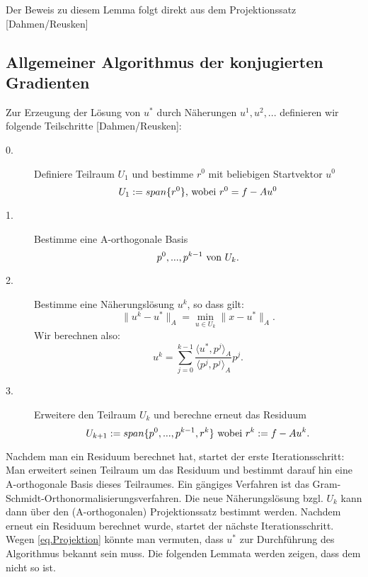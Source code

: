 Der Beweis zu diesem Lemma folgt direkt aus dem Projektionssatz [Dahmen/Reusken]

\subsection{Allgemeiner Algorithmus der konjugierten Gradienten}\label{ss.Allgemeiner CG-Algorithmus}

Zur Erzeugung der Lösung von $u^{*}$ durch Näherungen $u^{1}, u^{2},...$ definieren wir folgende Teilschritte [Dahmen/Reusken]:

\begin{description}

\item[0.] Definiere Teilraum $U_{1}$ und bestimme $r^{0}$ mit beliebigen Startvektor $u^{0}$
\begin{equation}
U_{1} := span\{r^{0}\} \textnormal{, wobei } r^{0} = f - Au^{0}
\end{equation}

\item[1.] Bestimme eine A-orthogonale Basis
\begin{equation}
p^{0},...,p^{k-1} \textnormal{ von } U_{k}.
\end{equation}

\item[2.] Bestimme eine Näherungslösung $u^{k}$, so dass gilt:
\begin{equation}
\|u^{k} - u^{*}\|_{A} = \underset{u \in U_{k}}{\min} \|x - u^{*}\|_{A}.
\end{equation}
Wir berechnen also:
\begin{equation}
u^{k} = \sum_{j=0}^{k-1} \frac {\langle u^{*}, p^{j} \rangle _{A}} {\langle p^{j}, p^{j} \rangle _{A}} p^{j}.\label{eq.Projektion}
\end{equation}

\item[3.] Erweitere den Teilraum $U_{k}$ und berechne erneut das Residuum
\begin{equation}
U_{k+1} := span\{p^{0},...,p^{k-1},r^{k}\} \textnormal{ wobei } r^{k} := f - Au^{k}.
\end{equation}

\end{description}

Nachdem man ein Residuum berechnet hat, startet der erste Iterationsschritt: Man erweitert seinen Teilraum um das Residuum und bestimmt darauf hin eine A-orthogonale Basis dieses Teilraumes. Ein gängiges Verfahren ist das Gram-Schmidt-Orthonormalisierungsverfahren. Die neue Näherungslösung bzgl. $U_{k}$ kann dann über den (A-orthogonalen) Projektionssatz bestimmt werden. Nachdem erneut ein Residuum berechnet wurde, startet der nächste Iterationsschritt.\\
Wegen \autoref{eq.Projektion} könnte man vermuten, dass $u^{*}$ zur Durchführung des Algorithmus bekannt sein muss. Die folgenden Lemmata werden zeigen, dass dem nicht so ist.

